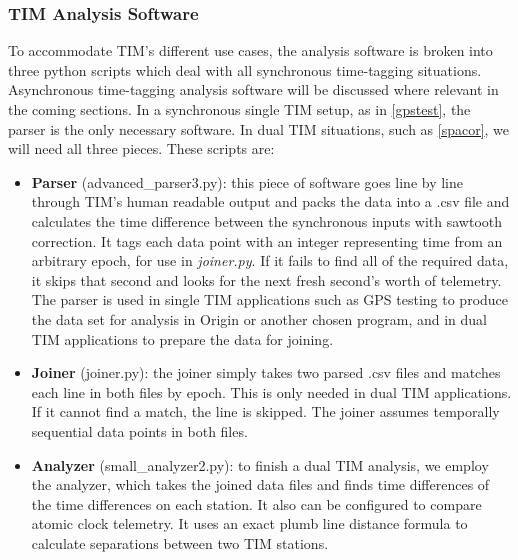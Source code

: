 \subsubsection{TIM Analysis Software}
\label{timanalysis}
To accommodate TIM's different use cases, the analysis software is broken into three python scripts which deal with all synchronous time-tagging situations. Asynchronous time-tagging analysis software will be discussed where relevant in the coming sections. In a synchronous single TIM setup, as in \autoref{gpstest}, the parser is the only necessary software. In dual TIM situations, such as \autoref{spacor}, we will need all three pieces. These scripts are:
\begin{itemize}
	\item \textbf{Parser} (advanced\_parser3.py): this piece of software goes line by line through TIM's human readable output and packs the data into a .csv file and calculates the time difference between the synchronous inputs with sawtooth correction. It tags each data point with an integer representing time from an arbitrary epoch, for use in \textit{joiner.py}. If it fails to find all of the required data, it skips that second and looks for the next fresh second's worth of telemetry. The parser is used in single TIM applications such as GPS testing to produce the data set for analysis in Origin or another chosen program, and in dual TIM applications to prepare the data for joining.

	\item \textbf{Joiner} (joiner.py): the joiner simply takes two parsed .csv files and matches each line in both files by epoch. This is only needed in dual TIM applications. If it cannot find a match, the line is skipped. The joiner assumes temporally sequential data points in both files.

	\item \textbf{Analyzer} (small\_analyzer2.py): to finish a dual TIM analysis, we employ the analyzer, which takes the joined data files and finds time differences of the time differences on each station. It also can be configured to compare atomic clock telemetry. It uses an exact plumb line distance formula to calculate separations between two TIM stations. 
\end{itemize}

